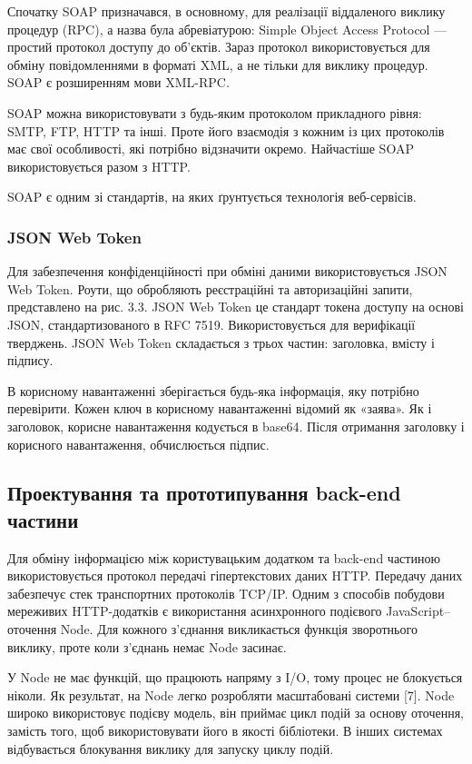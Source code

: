 Спочатку SOAP призначався, в основному, для реалізації віддаленого виклику процедур (RPC), а назва була абревіатурою: Simple Object Access Protocol — простий протокол доступу до об'єктів. Зараз протокол використовується для обміну повідомленнями в форматі XML, а не тільки для виклику процедур. SOAP є розширенням мови XML-RPC.

SOAP можна використовувати з будь-яким протоколом прикладного рівня: SMTP, FTP, HTTP та інші. Проте його взаємодія з кожним із цих протоколів має свої особливості, які потрібно відзначити окремо. Найчастіше SOAP використовується разом з HTTP.

SOAP є одним зі стандартів, на яких ґрунтується технологія веб-сервісів.

\subsubsection{JSON Web Token}

Для забезпечення конфіденційності при обміні даними використовується JSON Web Token. Роути, що обробляють реєстраційні та авторизаційні запити, представлено на рис. 3.3.
JSON Web Token це стандарт токена доступу на основі JSON, стандартизованого в RFC 7519. Використовується для верифікації тверджень. JSON Web Token складається з трьох частин: заголовка, вмісту і підпису.

В корисному навантаженні зберігається будь-яка інформація, яку потрібно перевірити. Кожен ключ в корисному навантаженні відомий як «заява». Як і заголовок, корисне навантаження кодується в base64. Після отримання заголовку і корисного навантаження, обчислюється підпис.

\subsection{Проектування та прототипування back-end частини}

Для обміну інформацією між користувацьким додатком та back-end частиною використовується протокол передачі гіпертекстових даних HTTP. Передачу даних забезпечує стек транспортних протоколів TCP/IP.
Одним з способів побудови мереживих HTTP-додатків є використання  асинхронного подієвого JavaScript–оточення Node. Для кожного з’єднання викликається функція зворотнього виклику, проте коли з’єднань немає Node засинає.

У Node не має функцій, що працюють напряму з I/O, тому процес не блокується ніколи. Як результат, на Node легко розробляти масштабовані системи [7].
Node широко використовує подієву модель, він приймає цикл подій за основу оточення, замість того, щоб використовувати його в якості бібліотеки. В інших системах відбувається блокування виклику для запуску циклу подій.

